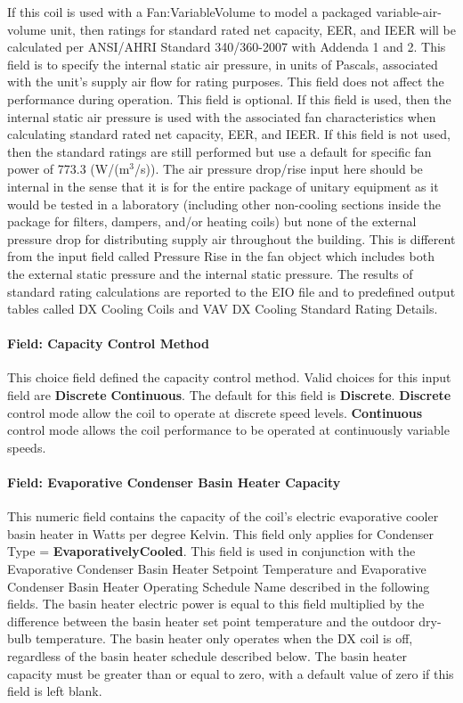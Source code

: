 If this coil is used with a Fan:VariableVolume to model a packaged variable-air-volume unit, then ratings for standard rated net capacity, EER, and IEER will be calculated per ANSI/AHRI Standard 340/360-2007 with Addenda 1 and 2. This field is to specify the internal static air pressure, in units of Pascals, associated with the unit's supply air flow for rating purposes. This field does not affect the performance during operation. This field is optional. If this field is used, then the internal static air pressure is used with the associated fan characteristics when calculating standard rated net capacity, EER, and IEER. If this field is not used, then the standard ratings are still performed but use a default for specific fan power of 773.3 (W/(m\(^{3}\)/s)). The air pressure drop/rise input here should be internal in the sense that it is for the entire package of unitary equipment as it would be tested in a laboratory (including other non-cooling sections inside the package for filters, dampers, and/or heating coils) but none of the external pressure drop for distributing supply air throughout the building. This is different from the input field called Pressure Rise in the fan object which includes both the external static pressure and the internal static pressure. The results of standard rating calculations are reported to the EIO file and to predefined output tables called DX Cooling Coils and VAV DX Cooling Standard Rating Details.

\paragraph{Field: Capacity Control Method}\label{field-capacity-control-method}

This choice field defined the capacity control method. Valid choices for this input field are \textbf{Discrete} \textbf{Continuous}. The default for this field is \textbf{Discrete}. \textbf{Discrete} control mode allow the coil to operate at discrete speed levels. \textbf{Continuous} control mode allows the coil performance to be operated at continuously variable speeds.

\paragraph{Field: Evaporative Condenser Basin Heater Capacity}\label{field-evaporative-condenser-basin-heater-capacity-000}

This numeric field contains the capacity of the coil's electric evaporative cooler basin heater in Watts per degree Kelvin. This field only applies for Condenser Type = \textbf{EvaporativelyCooled}. This field is used in conjunction with the Evaporative Condenser Basin Heater Setpoint Temperature and Evaporative Condenser Basin Heater Operating Schedule Name described in the following fields. The basin heater electric power is equal to this field multiplied by the difference between the basin heater set point temperature and the outdoor dry-bulb temperature. The basin heater only operates when the DX coil is off, regardless of the basin heater schedule described below. The basin heater capacity must be greater than or equal to zero, with a default value of zero if this field is left blank.

